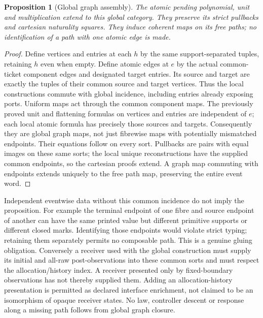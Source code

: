 \documentclass[11pt]{article}
\newtheorem{proposition}{Proposition}
\begin{document}
\begin{proposition}[Global graph assembly]
The atomic pending polynomial, unit and multiplication extend to this global category. They preserve its strict pullbacks and cartesian naturality squares. They induce coherent maps on its free paths; no identification of a path with one atomic edge is made.
\end{proposition}
\begin{proof}
Define vertices and entries at each $h$ by the same support-separated tuples, retaining $h$ even when empty. Define atomic edges at $e$ by the actual common-ticket component edges and designated target entries. Its source and target are exactly the tuples of their common source and target vertices. Thus the local constructions commute with global incidence, including entries already exposing ports. Uniform maps act through the common component maps. The previously proved unit and flattening formulas on vertices and entries are independent of $e$; each local atomic formula has precisely those sources and targets. Consequently they are global graph maps, not just fibrewise maps with potentially mismatched endpoints. Their equations follow on every sort. Pullbacks are pairs with equal images on these same sorts; the local unique reconstructions have the supplied common endpoints, so the cartesian proofs extend. A graph map commuting with endpoints extends uniquely to the free path map, preserving the entire event word.\end{proof}

Independent eventwise data without this common incidence do not imply the proposition. For example the terminal endpoint of one fibre and source endpoint of another can have the same printed value but different primitive supports or different closed marks. Identifying those endpoints would violate strict typing; retaining them separately permits no composable path. This is a genuine gluing obligation. Conversely a receiver used with the global construction must supply its initial and all-raw post-observations into these common sorts and must respect the allocation/history index. A receiver presented only by fixed-boundary observations has not thereby supplied them. Adding an allocation-history presentation is permitted as declared interface enrichment, not claimed to be an isomorphism of opaque receiver states. No law, controller descent or response along a missing path follows from global graph closure.
\end{document}
